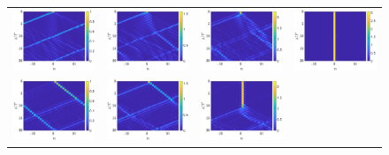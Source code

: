 \documentclass{article}
\begin{document}
\begin{figure}[H]
    \centering
    \begin{tabular}{cccc}
    \includegraphics[width=4cm]{left1} &
    \includegraphics[width=4cm]{left125} &
    \includegraphics[width=4cm]{left15} &
    \includegraphics[width=4cm]{left175} \\
    \includegraphics[width=4cm]{right1} &
    \includegraphics[width=4cm]{right125} &
    \includegraphics[width=4cm]{right15} &

\end{tabular}
\end{figure}
\end{document}
